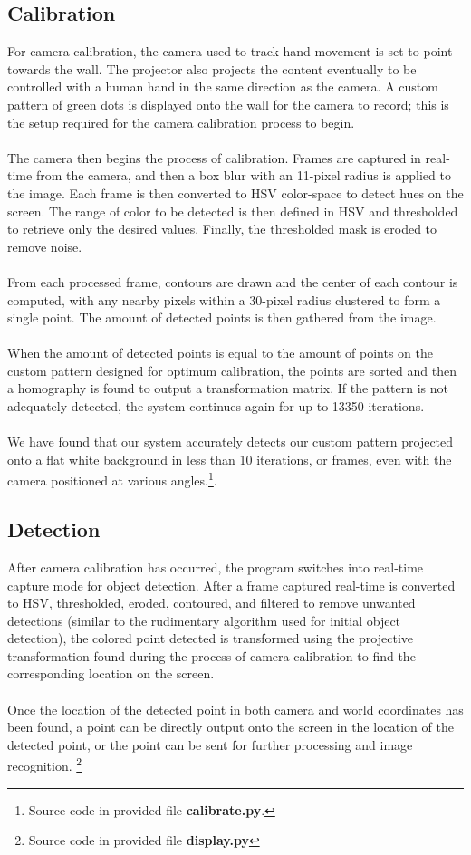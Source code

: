\documentclass[twoside,twocolumn]{article}
\begin{document}
\subsection{Calibration}
For camera calibration, the camera used to track hand movement is set to point towards the wall. The projector also projects the content eventually to be controlled with a human hand in the same direction as the camera. A custom pattern of green dots is displayed onto the wall for the camera to record; this is the setup required for the camera calibration process to begin.\\ \\
The camera then begins the process of calibration. Frames are captured in real-time from the camera, and then a box blur with an 11-pixel radius is applied to the image. Each frame is then converted to HSV color-space to detect hues on the screen. The range of color to be detected is then defined in HSV and thresholded to retrieve only the desired values. Finally, the thresholded mask is eroded to remove noise.\\ \\
From each processed frame, contours are drawn and the center of each contour is computed, with any nearby pixels within a 30-pixel radius clustered to form a single point. The amount of detected points is then gathered from the image. \\ \\
When the amount of detected points is equal to the amount of points on the custom pattern designed for optimum calibration, the points are sorted and then a homography is found to output a transformation matrix. If the pattern is not adequately detected, the system continues again for up to 13350 iterations.\\ \\
We have found that our system accurately detects our custom pattern projected onto a flat white background in less than 10 iterations, or frames, even with the camera positioned at various angles.\footnote{Source code in provided file \textbf{calibrate.py}.}.

\subsection{Detection}
After camera calibration has occurred, the program switches into real-time capture mode for object detection. After a frame captured real-time is converted to HSV, thresholded, eroded, contoured, and filtered to remove unwanted detections (similar to the rudimentary algorithm used for initial object detection), the colored point detected is transformed using the projective transformation found during the process of camera calibration to find the corresponding location on the screen.\\ \\ Once the location of the detected point in both camera and world coordinates has been found, a point can be directly output onto the screen in the location of the detected point, or the point can be sent for further processing and image recognition. \footnote{Source code in provided file \textbf{display.py}}
\end{document}
